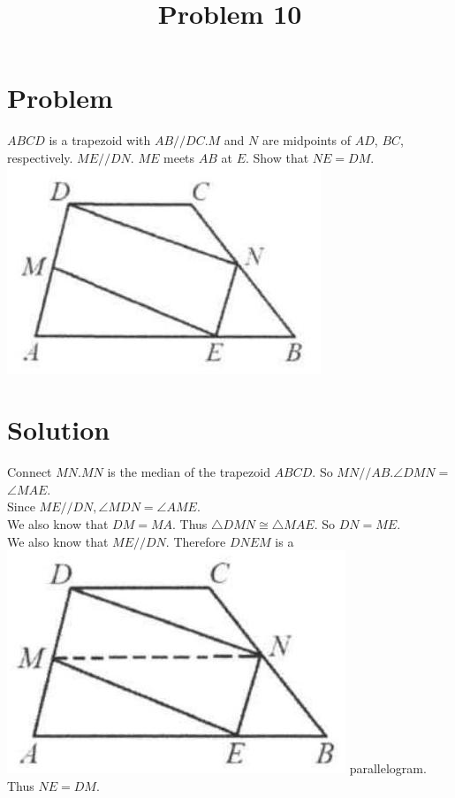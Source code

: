 \documentclass{article}
\title{Problem 10}
\date{}
\begin{document}
\maketitle

\section*{Problem}
\(A B C D\) is a trapezoid with \(A B / / D C . M\) and \(N\) are midpoints of \(A D\), \(B C\), respectively. \(M E / / D N\). \(M E\) meets \(A B\) at \(E\). Show that \(N E=D M\).\\
\centering
\includegraphics[width=\textwidth]{images/problem_image_1.jpg}

\section*{Solution}
Connect \(M N . M N\) is the median of the trapezoid \(A B C D\). So \(M N / / A B . \angle D M N=\) \(\angle M A E\).\\
Since \(M E / / D N, \angle M D N=\angle A M E\).\\
We also know that \(D M=M A\). Thus \(\triangle D M N \cong \triangle M A E\). So \(D N=M E\).\\
We also know that \(M E / / D N\). Therefore \(D N E M\) is a\\
\includegraphics[width=\textwidth]{images/reasoning_image_1.jpg} parallelogram. Thus \(N E=D M\).
\end{document}
